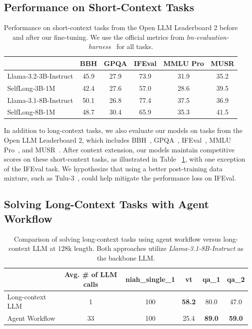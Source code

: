 \documentclass{article}
\begin{document}
\subsection{Performance on Short-Context Tasks}

\begin{table}[ht]
\centering
\caption{Performance on short-context tasks from the Open LLM Leaderboard 2 before and after our fine-tuning.
We use the official metrics from \emph{lm-evaluation-harness}~\citep{eval-harness} for all tasks.}
\begin{tabular}{lccccc}
\hline
 & BBH & GPQA & IFEval & MMLU Pro & MUSR \\ \hline
Llama-3.2-3B-Instruct & 45.9  & 27.9  &  73.9 & 31.9  & 35.2  \\
SelfLong-3B-1M  & 42.4 & 27.6 & 57.0  & 28.6  & 39.5  \\ \hline \hline
Llama-3.1-8B-Instruct & 50.1  & 26.8 & 77.4 & 37.5 & 36.9 \\
SelfLong-8B-1M & 48.7  & 30.4 & 65.9  & 35.3  & 41.5  \\ \hline
\end{tabular}
\label{tab:short_context_tasks}
\end{table}

In addition to long-context tasks,
we also evaluate our models on tasks from the Open LLM Leaderboard 2,
which includes BBH~\citep{suzgun2022challenging}, GPQA~\citep{rein2023gpqa},
IFEval~\citep{zhou2023instructionfollowing}, MMLU Pro~\citep{wang2024mmluprorobustchallengingmultitask},
and MUSR~\citep{sprague2024musrtestinglimitschainofthought}.
After context extension,
our models maintain competitive scores on these short-context tasks,
as illustrated in Table ~\ref{tab:short_context_tasks},
with one exception of the IFEval task.
We hypothesize that using a better post-training data mixture,
such as Tulu-3~\citep{lambert2024t},
could help mitigate the performance loss on IFEval.

\subsection{Solving Long-Context Tasks with Agent Workflow}

\begin{table}[ht]
\centering
\caption{Comparison of solving long-context tasks using agent workflow versus long-context LLM at $128$k length.
Both approaches utilize \emph{Llama-3.1-8B-Instruct} as the backbone LLM.}
\begin{tabular}{lccccc}
\hline
                 &  Avg. \# of LLM calls & niah\_single\_1 & vt & qa\_1 & qa\_2 \\ \hline
Long-context LLM &  1 &   100   &  \textbf{58.2}  &   80.0    &    47.0   \\
Agent Workflow   &  33  &  100   &  25.4  &   \textbf{89.0}    &   \textbf{59.0}    \\ \hline
\end{tabular}
\label{tab:ablation_long_context_or_agent}
\end{table}
\end{document}
